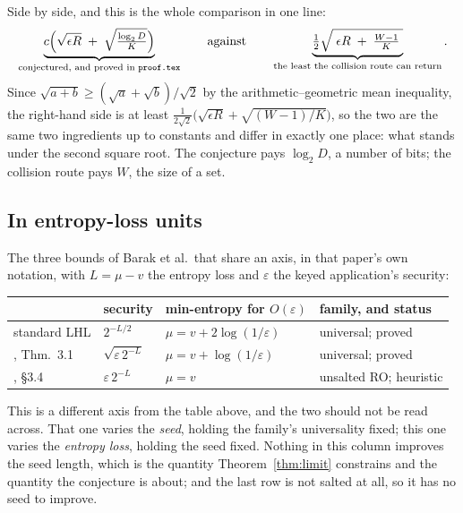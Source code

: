 \documentclass{aicr-solution}
\begin{document}
Side by side, and this is the whole comparison in one line:
\begin{equation}\label{eq:sidebyside}
  \underbrace{c\Bigl(\sqrt{\epsilon R} \;+\; \sqrt{\tfrac{\log_2 D}{K}}\Bigr)}_{\text{conjectured, and proved in \texttt{proof.tex}}}
  \qquad\text{against}\qquad
  \underbrace{\tfrac12\sqrt{\;\epsilon R \;+\; \tfrac{W-1}{K}\;}}_{\text{the least the collision route can return}} .
\end{equation}
Since $\sqrt{a+b} \ge (\sqrt a + \sqrt b)/\sqrt2$ by the arithmetic--geometric mean inequality, the
right-hand side is at least $\tfrac{1}{2\sqrt2}\bigl(\sqrt{\epsilon R} + \sqrt{(W-1)/K}\bigr)$, so
the two are the same two ingredients up to constants and differ in exactly one place: what stands
under the second square root. The conjecture pays $\log_2 D$, a number of bits; the collision route
pays $W$, the size of a set.


\subsection*{In entropy-loss units}

The three bounds of Barak et al.\ that share an axis, in that paper's own notation, with
$L = \mu - v$ the entropy loss and $\varepsilon$ the keyed application's security:

\begin{center}\small
\begin{tabular}{@{}llll@{}}
\toprule
 & security & min-entropy for $O(\varepsilon)$ & family, and status \\
\midrule
standard LHL                        & $2^{-L/2}$                    & $\mu = v + 2\log(1/\varepsilon)$ & universal; proved \\
\cite{BDKPPSY11}, Thm.~3.1          & $\sqrt{\varepsilon\,2^{-L}}$  & $\mu = v + \log(1/\varepsilon)$  & universal; proved \\
\cite{BDKPPSY11}, \S3.4             & $\varepsilon\,2^{-L}$         & $\mu = v$                        & unsalted RO; heuristic \\
\bottomrule
\end{tabular}
\end{center}

This is a different axis from the table above, and the two should not be read across. That one
varies the \emph{seed}, holding the family's universality fixed; this one varies the \emph{entropy
loss}, holding the seed fixed. Nothing in this column improves the seed length, which is the
quantity Theorem~\ref{thm:limit} constrains and the quantity the conjecture is about; and the last
row is not salted at all, so it has no seed to improve.
\end{document}
